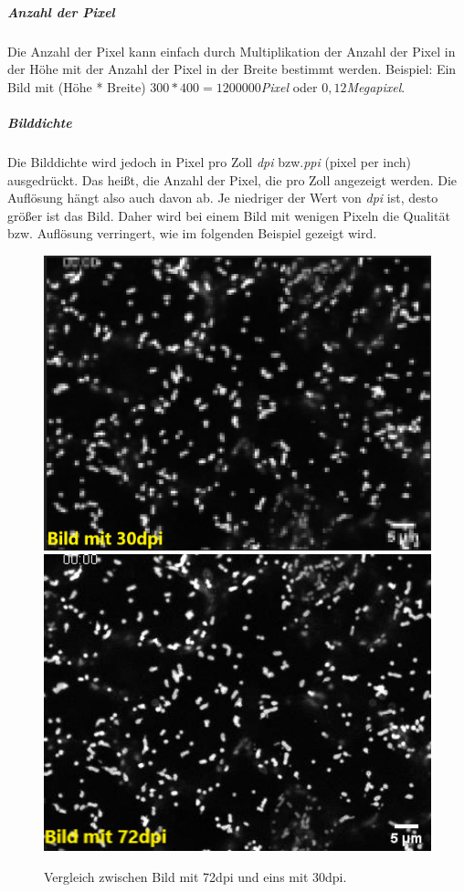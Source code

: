 \subparagraph{Anzahl der Pixel\\}
Die Anzahl der Pixel kann einfach durch Multiplikation der Anzahl der Pixel in der Höhe mit der Anzahl der Pixel in der Breite bestimmt werden. Beispiel: Ein Bild mit (Höhe * Breite) $300 * 400  = 1200000$\textit{Pixel} oder $0,12$\textit{Megapixel}.

\subparagraph{Bilddichte\\}
Die Bilddichte wird jedoch in Pixel pro Zoll \textit{dpi} bzw.\textit{ppi} (pixel per inch) ausgedrückt. Das heißt, die Anzahl der Pixel, die pro Zoll angezeigt werden. Die Auflösung hängt also auch davon ab.  Je niedriger der Wert von \textit{dpi} ist, desto größer ist das Bild. Daher wird bei einem Bild mit wenigen Pixeln die Qualität bzw. Auflösung verringert, wie im folgenden Beispiel gezeigt wird. 
\begin{figure}[H]
    \centering
    \includegraphics[width=1\textwidth]{Grafiken/trackpyBilder/30dpi.png}
    \includegraphics[width=1\textwidth]{Grafiken/trackpyBilder/72dpi.png}
    \caption{Vergleich zwischen Bild mit 72dpi und eins mit 30dpi.}
    \label{fig:kap0_72dpivs30dpi}
\end{figure}

